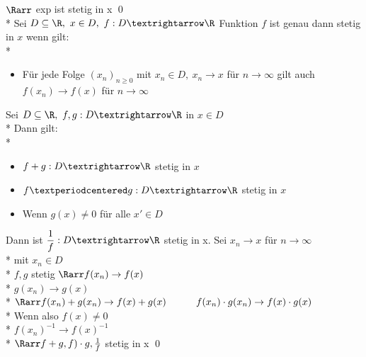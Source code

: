 $\Rarr$ exp ist stetig in x \qed\\*
%
Sei $D\subseteq\R,\ x\in D,\ f:D→\R$ Funktion $f$ ist genau dann stetig in $x$ wenn gilt:\\*
\begin{itemize}
\item{Für jede Folge $(x_n)_{n\geq 0}$ mit $x_n\in D,\ x_n→x$ für $n→∞$ gilt auch $f(x_n)→f(x)$ für $n→∞$}
\end{itemize}
%
Sei $D\subseteq\R,\ f,g:D→\R$ in $x\in D$\\*
Dann gilt:\\*
\begin{itemize}
\item{$f+g:D→\R$ stetig in $x$}
\item{$f·g:D→\R$ stetig in $x$}
\item{Wenn $g(x)\neq 0$ für alle $x'\in D$}
\end{itemize}
Dann ist $\dfrac{1}{f}:D→\R$ stetig in x.
Sei $x_n \to x$ für $n \to \infty$\\*
mit $x_n \in D$\\*
$f, g$ stetig $\Rarr f(x_n) \to f(x)$ \\*
\phantom{$f, g$ stetig \Rarr}$g(x_n) \to g(x)$\\*
$\Rarr f(x_n) + g(x_n) \to f(x) + g(x)$
$\phantom{\Rarr} f(x_n) \cdot g(x_n) \to f(x) \cdot g(x)$\\*
Wenn also $f(x) \neq 0$\\*
$f(x_n)^{-1} \to f(x)^{-1}$\\*
$\Rarr f + g, f) \cdot g, \frac{1}{f}$ stetig in x \qed
